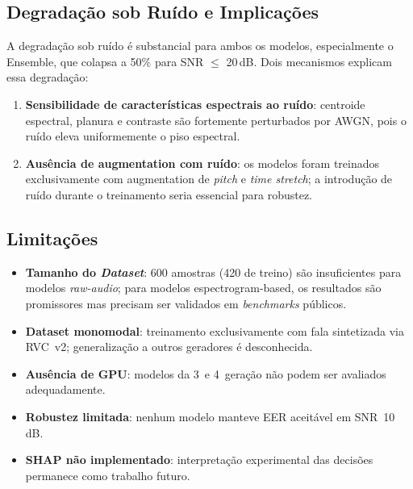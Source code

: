 \documentclass[12pt,a4paper]{article}
\begin{document}
\subsection{Degrada\c{c}\~{a}o sob Ru\'{i}do e Implica\c{c}\~{o}es}

A degrada\c{c}\~{a}o sob ru\'{i}do \'{e} substancial para ambos os modelos,
especialmente o Ensemble, que colapsa a 50\% para SNR $\leq$ 20\,dB.
Dois mecanismos explicam essa degrada\c{c}\~{a}o:

\begin{enumerate}
    \item \textbf{Sensibilidade de caracter\'{i}sticas espectrais ao
    ru\'{i}do}: centroide espectral, planura e contraste s\~{a}o fortemente
    perturbados por AWGN, pois o ru\'{i}do eleva uniformemente o piso
    espectral.
    \item \textbf{Aus\^{e}ncia de augmentation com ru\'{i}do}: os modelos
    foram treinados exclusivamente com augmentation de \textit{pitch} e
    \textit{time stretch}; a introdu\c{c}\~{a}o de ru\'{i}do durante o
    treinamento seria essencial para robustez.
\end{enumerate}

\subsection{Limitações}

\begin{itemize}
    \item \textbf{Tamanho do \textit{Dataset}}: 600 amostras (420 de
    treino) s\~{a}o insuficientes para modelos \textit{raw-audio};
    para modelos espectrogram-based, os resultados s\~{a}o promissores
    mas precisam ser validados em \textit{benchmarks} p\'{u}blicos.
    \item \textbf{Dataset monomodal}: treinamento exclusivamente com
    fala sintetizada via RVC~v2; generaliza\c{c}\~{a}o a outros geradores
    \'{e} desconhecida.
    \item \textbf{Aus\^{e}ncia de GPU}: modelos da 3\textordfeminine\
    e 4\textordfeminine\ gera\c{c}\~{a}o n\~{a}o podem ser avaliados
    adequadamente.
    \item \textbf{Robustez limitada}: nenhum modelo manteve EER aceit\'{a}vel
    em SNR~10\,dB.
    \item \textbf{SHAP n\~{a}o implementado}: interpreta\c{c}\~{a}o
    experimental das decis\~{o}es permanece como trabalho futuro.
\end{itemize}
\end{document}
